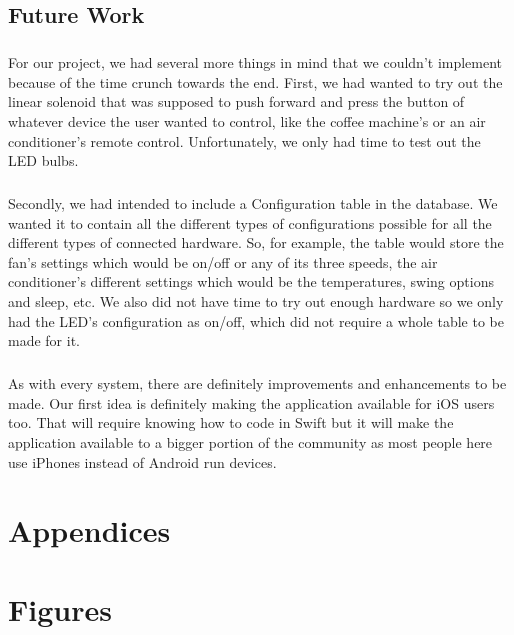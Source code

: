 \documentclass[12pt, oneside, a4paper]{book}
\newcommand{\mychapter}[1]{\newpage%
	\thispagestyle{empty}
	\topskip0pt%
	\vspace*{\fill}%
	\addtocounter{chapter}{1}%
	\begin{center}%
		\textbf{\Large{\color{chapter}{CHAPTER NO. \thechapter \\ \uppercase{#1}}}}%
	\end{center}%
	\vspace*{\fill}%
	\addtocounter{chapter}{-1}
	\newpage%
	\chapter{#1}
}
\begin{document}
		\section{Future Work}
		\paragraph{}For our project, we had several more things in mind that we couldn’t implement because of the time crunch towards the end. First, we had wanted to try out the linear solenoid that was supposed to push forward and press the button of whatever device the user wanted to control, like the coffee machine’s or an air conditioner’s remote control. Unfortunately, we only had time to test out the LED bulbs.
		\paragraph{}Secondly, we had intended to include a Configuration table in the database. We wanted it to contain all the different types of configurations possible for all the different types of connected hardware. So, for example, the table would store the fan’s settings which would be on/off or any of its three speeds, the air conditioner’s different settings which would be the temperatures, swing options and sleep, etc. We also did not have time to try out enough hardware so we only had the LED’s configuration as on/off, which did not require a whole table to be made for it.
		\paragraph{}As with every system, there are definitely improvements and enhancements to be made. Our first idea is definitely making the application available for iOS users too. That will require knowing how to code in Swift but it will make the application available to a bigger portion of the community as most people here use iPhones instead of Android run devices.
	\newpage
	
	
	

	
	\renewcommand{\bibname}{References}
	


	\clearpage
	\mychapter{Appendices}
	\appendix
		\chapter{Figures}
\end{document}
